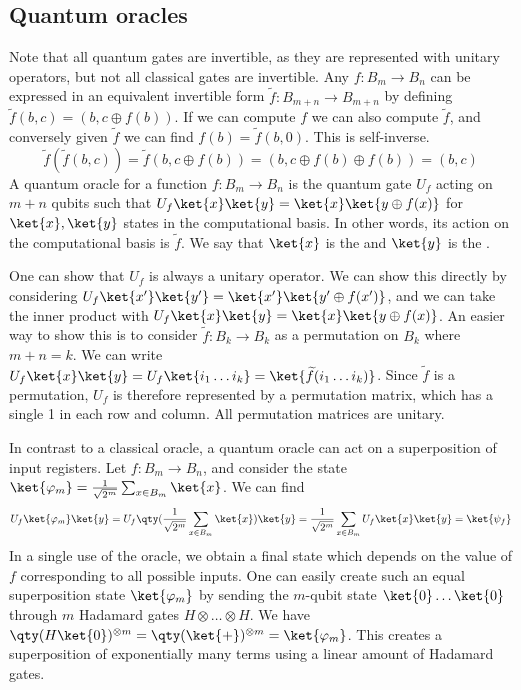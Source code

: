 \subsection{Quantum oracles}
Note that all quantum gates are invertible, as they are represented with unitary operators, but not all classical gates are invertible.
Any $f \colon B_m \to B_n$ can be expressed in an equivalent invertible form $\widetilde f \colon B_{m+n} \to B_{m+n}$ by defining $\widetilde f(b,c) = (b, c \oplus f(b))$.
If we can compute $f$ we can also compute $\widetilde f$, and conversely given $\widetilde f$ we can find $f(b) = \widetilde f(b, 0)$.
This is self-inverse.
\[ \widetilde f(\widetilde f(b,c)) = \widetilde f(b, c \oplus f(b)) = (b, c \oplus f(b) \oplus f(b)) = (b, c) \]
A quantum oracle for a function $f \colon B_m \to B_n$ is the quantum gate $U_f$ acting on $m + n$ qubits such that $U_f \ket{x} \ket{y} = \ket{x} \ket{y \oplus f(x)}$ for $\ket{x}, \ket{y}$ states in the computational basis.
In other words, its action on the computational basis is $\widetilde f$.
We say that $\ket{x}$ is the  and $\ket{y}$ is the .

One can show that $U_f$ is always a unitary operator.
We can show this directly by considering $U_f \ket{x'}\ket{y'} = \ket{x'}\ket{y' \oplus f(x')}$, and we can take the inner product with $U_f \ket{x} \ket{y} = \ket{x} \ket{y \oplus f(x)}$.
An easier way to show this is to consider $\widetilde f \colon B_k \to B_k$ as a permutation on $B_k$ where $m + n = k$.
We can write $U_f \ket{x} \ket{y} = U_f \ket{i_1 \dots i_k} = \ket{\widetilde f(i_1 \dots i_k)}$.
Since $\widetilde f$ is a permutation, $U_f$ is therefore represented by a permutation matrix, which has a single 1 in each row and column.
All permutation matrices are unitary.

In contrast to a classical oracle, a quantum oracle can act on a superposition of input registers.
Let $f \colon B_m \to B_n$, and consider the  state $\ket{\varphi_m} = \frac{1}{\sqrt{2^m}} \sum_{x \in B_m} \ket{x}$.
We can find
\[ U_f \ket{\varphi_m} \ket{y} = U_f \qty( \frac{1}{\sqrt{2^m}} \sum_{x \in B_m} \ket{x}) \ket{y} = \frac{1}{\sqrt{2^m}} \sum_{x \in B_m} U_f \ket{x} \ket{y} = \ket{\psi_f} \]
In a single use of the oracle, we obtain a final state which depends on the value of $f$ corresponding to all possible inputs.
One can easily create such an equal superposition state $\ket{\varphi_m}$ by sending the $m$-qubit state $\ket{0} \dots \ket{0}$ through $m$ Hadamard gates $H \otimes \dots \otimes H$.
We have $\qty(H \ket{0})^{\otimes m} = \qty(\ket{+})^{\otimes m} = \ket{\varphi_m}$.
This creates a superposition of exponentially many terms using a linear amount of Hadamard gates.

